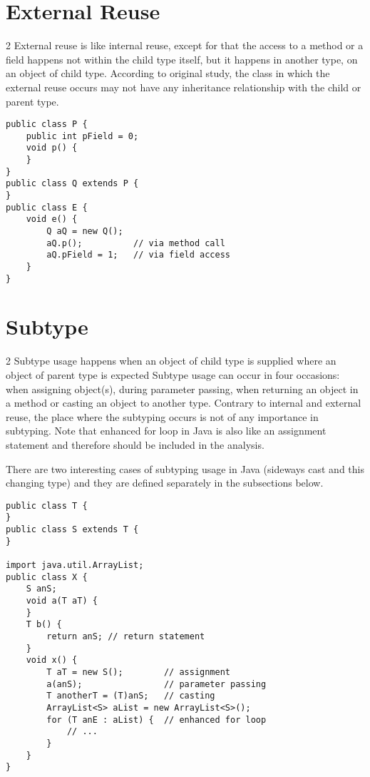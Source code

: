 \documentclass{uvamscse}
\begin{document}
\section{External Reuse}
\begin{multicols} {2}
External reuse is like internal reuse, except for that the access to a method or a field happens not within the child type itself, but it happens in another type, on an object of child type. According to original study, the class in which the external reuse occurs may not have any inheritance relationship with the child or parent type.
\columnbreak
\begin{verbatim}
public class P {
    public int pField = 0;
    void p() {
    }
}
public class Q extends P {
}
public class E {
    void e() {
        Q aQ = new Q();
        aQ.p();          // via method call
        aQ.pField = 1;   // via field access
    }
}
\end{verbatim}
\end{multicols}


\section{Subtype}
\begin{multicols} {2}
Subtype usage happens when an object of child type is supplied where an  object of parent type is expected Subtype usage can occur in four occasions: when assigning object(s), during parameter passing, when returning an object in a method or casting an object to another type. Contrary to internal and external reuse, the place where the subtyping occurs is not of any importance in subtyping. Note that enhanced for loop in Java is also like an assignment statement and therefore should be included in the analysis.

There are two interesting cases of subtyping usage in Java (sideways cast and this changing type) and they are defined separately in the subsections below.

\columnbreak
\begin{verbatim}
public class T {
}
public class S extends T {
}
    
import java.util.ArrayList;
public class X {
    S anS;
    void a(T aT) {
    }
    T b() {
        return anS; // return statement
    }
    void x() {
        T aT = new S();        // assignment
        a(anS);                // parameter passing
        T anotherT = (T)anS;   // casting
        ArrayList<S> aList = new ArrayList<S>();
        for (T anE : aList) {  // enhanced for loop
            // ...
        }
    }
}

\end{verbatim}
\end{multicols}
\end{document}
